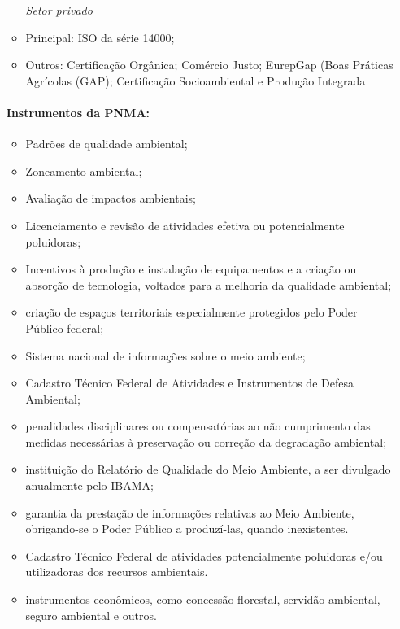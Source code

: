 \documentclass[
]{article}
\begin{document}
\begin{itemize}
\begin{itemize}
    \emph{Setor privado}
  \item
    Principal: ISO da série 14000;
  \item
    Outros: Certificação Orgânica; Comércio Justo; EurepGap (Boas
    Práticas Agrícolas (GAP); Certificação Socioambiental e Produção
    Integrada
  \end{itemize}

  \hypertarget{instrumentos-da-pnma}{%
  \paragraph{Instrumentos da PNMA:}\label{instrumentos-da-pnma}}

  \begin{itemize}
  \item
    Padrões de qualidade ambiental;
  \item
    Zoneamento ambiental;
  \item
    Avaliação de impactos ambientais;
  \item
    Licenciamento e revisão de atividades efetiva ou potencialmente
    poluidoras;
  \item
    Incentivos à produção e instalação de equipamentos e a criação ou
    absorção de tecnologia, voltados para a melhoria da qualidade
    ambiental;
  \item
    criação de espaços territoriais especialmente protegidos pelo Poder
    Público federal;
  \item
    Sistema nacional de informações sobre o meio ambiente;
  \item
    Cadastro Técnico Federal de Atividades e Instrumentos de Defesa
    Ambiental;
  \item
    penalidades disciplinares ou compensatórias ao não cumprimento das
    medidas necessárias à preservação ou correção da degradação
    ambiental;
  \item
    instituição do Relatório de Qualidade do Meio Ambiente, a ser
    divulgado anualmente pelo IBAMA;
  \item
    garantia da prestação de informações relativas ao Meio Ambiente,
    obrigando-se o Poder Público a produzí-las, quando inexistentes.
  \item
    Cadastro Técnico Federal de atividades potencialmente poluidoras
    e/ou utilizadoras dos recursos ambientais.
  \item
    instrumentos econômicos, como concessão florestal, servidão
    ambiental, seguro ambiental e outros.
  \end{itemize}
\end{itemize}
\end{document}
